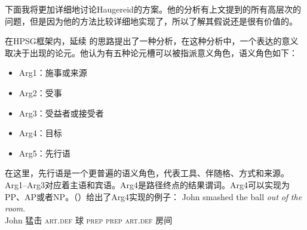 \begin{exe}
\begin{xlist}[iv.]
\begin{exe}
\begin{xlist}[iv.]
下面我将更加详细地讨论Haugereid\citeyearpar{Haugereid2007a}的方案。他的分析有上文提到的所有高层次的问题，但是因为他的方法比较详细地实现了，所以了解其假说还是很有价值的。

\mbox{} \citet{Haugereid2007a}在HPSG框架内，延续 \citet{Borer2005a-u}的思路提出了一种分析，在这种分析中，一个表达的意义取决于出现的论元。他认为有五种论元槽可以被指派意义角色，语义角色如下：
\begin{itemize}
\item Arg1：施事或来源
\item Arg2：受事
\item Arg3：受益者或接受者
\item Arg4：目标
\item Arg5：先行语
\end{itemize}
在这里，先行语是一个更普遍的语义角色，代表工具、伴随格、方式和来源。Arg1--Arg3对应着主语和宾语。Arg4是路径终点的结果谓词。Arg4可以实现为PP、AP或者NP。（）给出了Arg4实现的例子：
\eal
\ex 
\gll John smashed the ball \emph{out} \emph{of} \emph{the} \emph{room}.\\
     John 猛击 \textsc{art}.\textsc{def} 球 \textsc{prep} \textsc{prep} \textsc{art}.\textsc{def} 房间\\

\end{xlist}
\end{exe}
\end{xlist}
\end{exe}
